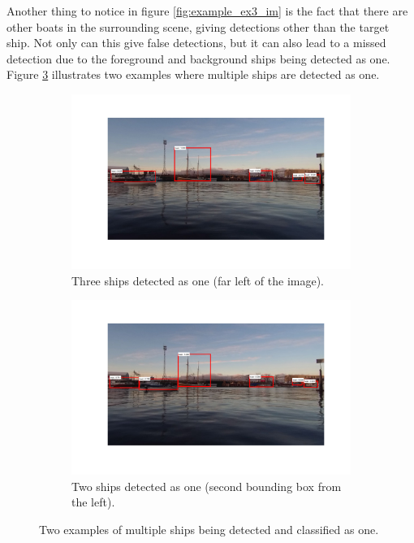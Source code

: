 Another thing to notice in figure \ref{fig:example_ex3_im} is the fact that there are other boats in the surrounding scene, giving detections other than the target ship. Not only can this give false detections, but it can also lead to a missed detection due to the foreground and background ships being detected as one. Figure \ref{fig:issues_multiple_detections} illustrates two examples where multiple ships are detected as one. 
\begin{figure}
	\centering
	\begin{subfigure}[t]{.5\textwidth}
		\centering
		\includegraphics[width=\linewidth]{fig/issue_overlapping.png}
		\caption{Three ships detected as one (far left of the image).}
		\label{fig:sub_issue1}
	\end{subfigure}%
	\begin{subfigure}[t]{.5\textwidth}
		\centering
		\includegraphics[width=\linewidth]{fig/issue_2.png}
		\caption{Two ships detected as one (second bounding box from the left).}
		\label{fig:sub_issue2}
	\end{subfigure}
	\caption{Two examples of multiple ships being detected and classified as one.}
	\label{fig:issues_multiple_detections}
\end{figure} 
